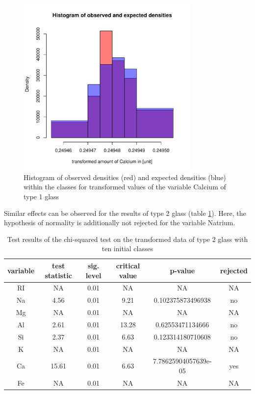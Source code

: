 \documentclass[a4paper, 12pt, titlepage, headsepline, listof = totoc, bibliography = totoc, numbers = noenddot]{scrartcl}
\begin{document}
\begin{figure}[h!]
\centering
\includegraphics[width=0.8\textwidth]{report-chisqType1CaTrans}
\caption{Histogram of observed densities (red) and expected densities (blue) within the classes for transformed values of the variable Calcium of type 1 glass}
\label{fig:chisqType1CaTrans}
\end{figure}



Similar effects can be observed for the results of type 2 glass (table \ref{tab:chi-type2-trans}). Here, the hypothesis of normality is additionally not rejected for the variable Natrium.

\begin{table}[h!]
\centering
\begin{tabular}{|cccccc|} \hline variable & test statistic & sig. level & critical value & p-value & rejected\\ \hline RI & NA & 0.01 & NA & NA & NA\\ 
Na & 4.56 & 0.01 & 9.21 & 0.102375873496938 & no\\ 
Mg & NA & 0.01 & NA & NA & NA\\ 
Al & 2.61 & 0.01 & 13.28 & 0.62553471134666 & no\\ 
Si & 2.37 & 0.01 & 6.63 & 0.123314180710608 & no\\ 
K & NA & 0.01 & NA & NA & NA\\ 
Ca & 15.61 & 0.01 & 6.63 & 7.78625904057639e-05 & yes\\ 
Fe & NA & 0.01 & NA & NA & NA\\ \hline \end{tabular}\caption{Test results of the chi-squared test on the transformed data of type 2 glass with ten initial classes}
\label{tab:chi-type2-trans}
\end{table}
\end{document}
